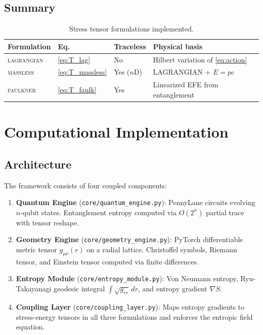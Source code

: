 \documentclass[12pt,a4paper]{article}
\newcommand{\gmn}{g_{\mu\nu}}
\begin{document}
\subsection{Summary}

\begin{table}[h]
\centering
\caption{Stress tensor formulations implemented.}
\label{tab:formulations}
\begin{tabular}{llll}
\toprule
Formulation & Eq. & Traceless & Physical basis \\
\midrule
\textsc{lagrangian} & \eqref{eq:T_lag} & No & Hilbert variation of \eqref{eq:action} \\
\textsc{massless}   & \eqref{eq:T_massless} & Yes ($n$D) & LAGRANGIAN + $E=pc$ \\
\textsc{faulkner}   & \eqref{eq:T_faulk} & Yes & Linearized EFE from entanglement \cite{faulkner2014} \\
\bottomrule
\end{tabular}
\end{table}

\section{Computational Implementation}
\label{sec:impl}

\subsection{Architecture}

The framework consists of four coupled components:
\begin{enumerate}
  \item \textbf{Quantum Engine} (\texttt{core/quantum\_engine.py}):
        PennyLane circuits evolving $n$-qubit states. Entanglement entropy
        computed via $O(2^n)$ partial trace with tensor reshape.
  \item \textbf{Geometry Engine} (\texttt{core/geometry\_engine.py}):
        PyTorch differentiable metric tensor $\gmn(r)$ on a radial lattice.
        Christoffel symbols, Riemann tensor, and Einstein tensor computed
        via finite differences.
  \item \textbf{Entropy Module} (\texttt{core/entropy\_module.py}):
        Von Neumann entropy, Ryu-Takayanagi geodesic integral
        $\int\sqrt{g_{rr}}\,dr$, and entropy gradient $\nabla S$.
  \item \textbf{Coupling Layer} (\texttt{core/coupling\_layer.py}):
        Maps entropy gradients to stress-energy tensors in all three
        formulations and enforces the entropic field equation.
\end{enumerate}
\end{document}
